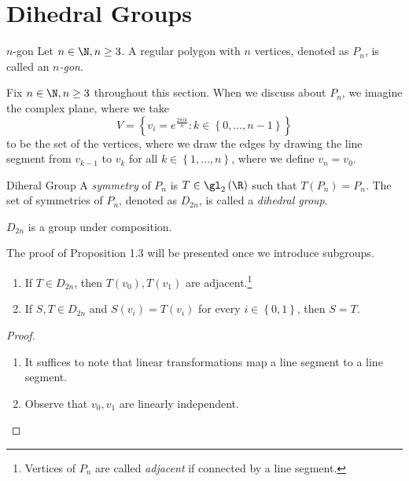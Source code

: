 \documentclass[pmath347]{subfiles}
\begin{document}
    \clearpage
    \section{Dihedral Groups}

    \begin{definition}{$n$-gon}{}
        Let $n\in\N,n\geq 3$. A regular polygon with $n$ vertices, denoted as $P_n$, is called an \emph{$n$-gon}.
    \end{definition}

    \np Fix $n\in\N, n\geq 3$ throughout this section. When we discuss about $P_n$, we imagine the complex plane, where we take
    \begin{equation*}
        V = \left\lbrace v_i = e^{\frac{2\pi ik}{n}}:k\in\left\lbrace 0,\ldots,n-1 \right\rbrace  \right\rbrace 
    \end{equation*}
    to be the set of the vertices, where we draw the edges by drawing the line segment from $v_{k-1}$ to $v_k$ for all $k\in\left\lbrace 1,\ldots,n \right\rbrace$, where we define $v_n = v_0$.

    \begin{definition}{Diheral Group}{}
        A \emph{symmetry} of $P_n$ is $T\in\gl_2\left( \R \right)$ such that $T\left( P_n \right) = P_n$. The set of symmetries of $P_n$, denoted as $D_{2n}$, is called a \emph{dihedral group}.
    \end{definition}

    \begin{prop}{}
        $D_{2n}$ is a group under composition.
    \end{prop}

    \noindent The proof of Proposition 1.3 will be presented once we introduce subgroups.

    \begin{prop}{}
        \begin{enumerate}
            \item If $T\in D_{2n}$, then $T\left( v_0 \right) , T\left( v_1 \right)$ are adjacent.\footnote{Vertices of $P_n$ are called \emph{adjacent} if connected by a line segment.}
            \item If $S,T\in D_{2n}$ and $S\left( v_i \right) = T\left( v_i \right)$ for every $i\in\left\lbrace 0,1 \right\rbrace$, then $S=T$.
        \end{enumerate}
    \end{prop}

    \begin{proof}
        \begin{enumerate}
            \item It suffices to note that linear transformations map a line segment to a line segment. \qqqedsym
            \item Observe that $v_0,v_1$ are linearly independent. \qqedsym
        \end{enumerate}
    \end{proof}
\end{document}
